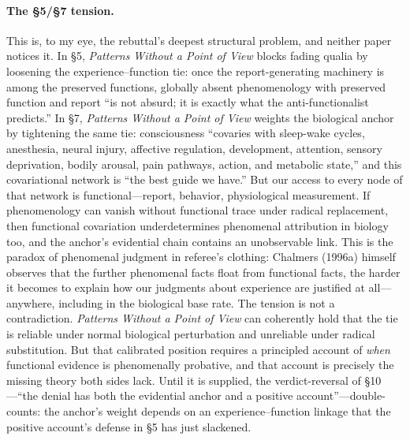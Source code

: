 \documentclass[11pt]{article}
\newcommand{\PP}{\emph{Patterns Without a Point of View}}
\begin{document}
\paragraph{The \S 5/\S 7 tension.} This is, to my eye, the rebuttal's deepest structural problem, and neither paper notices it. In \S 5, \PP{} blocks fading qualia by loosening the experience--function tie: once the report-generating machinery is among the preserved functions, globally absent phenomenology with preserved function and report ``is not absurd; it is exactly what the anti-functionalist predicts.'' In \S 7, \PP{} weights the biological anchor by tightening the same tie: consciousness ``covaries with sleep-wake cycles, anesthesia, neural injury, affective regulation, development, attention, sensory deprivation, bodily arousal, pain pathways, action, and metabolic state,'' and this covariational network is ``the best guide we have.'' But our access to every node of that network is functional---report, behavior, physiological measurement. If phenomenology can vanish without functional trace under radical replacement, then functional covariation underdetermines phenomenal attribution in biology too, and the anchor's evidential chain contains an unobservable link. This is the paradox of phenomenal judgment in referee's clothing: Chalmers (1996a) himself observes that the further phenomenal facts float from functional facts, the harder it becomes to explain how our judgments about experience are justified at all---anywhere, including in the biological base rate. The tension is not a contradiction. \PP{} can coherently hold that the tie is reliable under normal biological perturbation and unreliable under radical substitution. But that calibrated position requires a principled account of \emph{when} functional evidence is phenomenally probative, and that account is precisely the missing theory both sides lack. Until it is supplied, the verdict-reversal of \S 10---``the denial has both the evidential anchor and a positive account''---double-counts: the anchor's weight depends on an experience--function linkage that the positive account's defense in \S 5 has just slackened.
\end{document}
